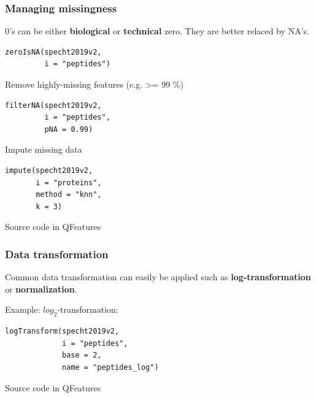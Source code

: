 \documentclass{beamer}
\newcommand{\hcode}[2][lgray]{{\ttfamily\color{vdgray}\colorbox{#1}{#2}}}
\newcommand{\frametitlesection}[1]{\frametitle{\centering #1 \footnotesize \hspace{0pt plus 1 filll} \insertsection}}
\begin{document}
\begin{frame}[fragile]
    \frametitlesection{Managing missingness}

    \hcode{0}'s can be either \textbf{biological} or \textbf{technical} zero.
    They are better relaced by \hcode{NA}'s.

    \begin{lstlisting}
zeroIsNA(specht2019v2,
         i = "peptides")
    \end{lstlisting}

    Remove highly-missing features (e.g. >= 99 \%)
    
    \begin{lstlisting}
filterNA(specht2019v2,
         i = "peptides",
         pNA = 0.99)
    \end{lstlisting}
    
    Impute missing data
    
    \begin{lstlisting}
impute(specht2019v2, 
       i = "proteins", 
       method = "knn", 
       k = 3)
    \end{lstlisting}
    
    

    Source code in \hcode{QFeatures}

\end{frame}

\begin{frame}[fragile]
    \frametitlesection{Data transformation}

    Common data transformation can easily be applied such as \textbf{log-transformation}
    or \textbf{normalization}.
    
    \bigskip


    Example: $log_2$-transformation:

    \begin{lstlisting}
logTransform(specht2019v2,
             i = "peptides",
             base = 2,
             name = "peptides_log")
    \end{lstlisting}

    Source code in \hcode{QFeatures}

\end{frame}
\end{document}
